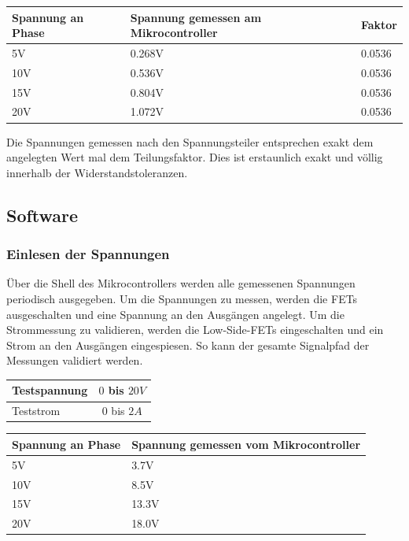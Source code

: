 \begin{center}
	\begin{tabular}{l|l|l}
		Spannung an Phase & Spannung gemessen am Mikrocontroller & Faktor\\ \hline
		5V & 0.268V & 0.0536\\ \hline
		10V & 0.536V & 0.0536\\ \hline
		15V & 0.804V & 0.0536\\ \hline
		20V & 1.072V & 0.0536\\ \hline
	\end{tabular} 
	\label{tab:spannteiler}
\end{center}

Die Spannungen gemessen nach den Spannungsteiler entsprechen exakt dem angelegten Wert mal dem Teilungsfaktor. Dies ist erstaunlich exakt und völlig innerhalb der Widerstandstoleranzen.

\subsection{Software}
\subsubsection*{Einlesen der Spannungen}
Über die Shell des Mikrocontrollers werden alle gemessenen Spannungen periodisch ausgegeben. Um die Spannungen zu messen, werden die FETs ausgeschalten und eine Spannung an den Ausgängen angelegt. Um die Strommessung zu validieren, werden die Low-Side-FETs eingeschalten und ein Strom an den Ausgängen eingespiesen. So kann der gesamte Signalpfad der Messungen validiert werden.

\begin{center}
	\begin{tabular}{l|c}
		\hline 
		Testspannung & $0$ bis $20V$ \\ \hline
		Teststrom & $0$ bis $2A$ \\ \hline
	\end{tabular} 
	\label{tab:swvmessbed}
\end{center}

\begin{center}
	\begin{tabular}{l|l} 
		Spannung an Phase & Spannung gemessen vom Mikrocontroller \\ \hline
		5V & 3.7V\\ \hline
		10V & 8.5V\\ \hline
		15V & 13.3V\\ \hline
		20V & 18.0V\\ \hline
	\end{tabular} 
	\label{tab:spannsw}
\end{center}

